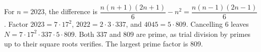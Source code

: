 For $n=2023$, the difference is $\dfrac{n(n+1)(2n+1)}{6}-n^2=\dfrac{n(n-1)(2n-1)}{6}$. Factor $2023=7\cdot17^2$, $2022=2\cdot3\cdot337$, and $4045=5\cdot809$. Cancelling $6$ leaves $N=7\cdot17^2\cdot337\cdot5\cdot809$. Both $337$ and $809$ are prime, as trial division by primes up to their square roots verifies. The largest prime factor is $\boxed{809}$.
